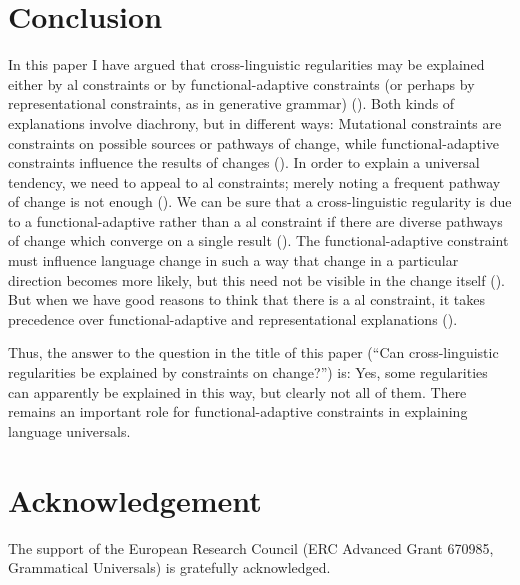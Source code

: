 \documentclass[output=paper]{langsci/langscibook}
\begin{document}
\section{Conclusion}\label{sec:haspelmath:8}

In this paper I have argued that cross-linguistic regularities may be explained either by al constraints or by functional-adaptive constraints (or perhaps by representational constraints, as in generative grammar) (). Both kinds of explanations involve diachrony, but in different ways: Mutational constraints are constraints on possible sources or pathways of change, while functional-adaptive constraints influence the results of changes (). In order to explain a universal tendency, we need to appeal to al constraints; merely noting a frequent pathway of change is not enough (). We can be sure that a cross-linguistic regularity is due to a functional-adaptive rather than a al constraint if there are diverse pathways of change which converge on a single result (). The functional-adaptive constraint must influence language change in such a way that change in a particular direction becomes more likely, but this need not be visible in the change itself (). But when we have good reasons to think that there is a al constraint, it takes precedence over functional-adaptive and representational explanations ().

Thus, the answer to the question in the title of this paper (“Can cross-linguistic regularities be explained by constraints on change?”) is: Yes, some regularities can apparently be explained in this way, but clearly not all of them. There remains an important role for functional-adaptive constraints in explaining language universals.

\section*{Acknowledgement}

The support of the European Research Council (ERC Advanced Grant 670985, Grammatical Universals) is gratefully acknowledged. 

\sloppy
\printbibliography[heading=subbibliography,notkeyword=this] 
 
\end{document}
